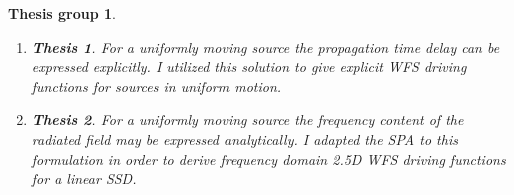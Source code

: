 \documentclass[10pt,twoside]{article}
\theoremstyle{thesisgroupstyle}
\newtheorem{thesisgroup}{Thesis group}
\newtheorem{thesis}{Thesis}[thesisgroup]
\begin{document}
\begin{thesisgroup}
\begin{enumerate}
\item[] \vspace{-7mm}\begin{thesis}For a uniformly moving source the propagation time delay can be expressed explicitly.
I utilized this solution to give explicit WFS driving functions for sources in uniform motion.\end{thesis}
\item[] \vspace{-7mm}\begin{thesis}For a uniformly moving source the frequency content of the radiated field may be expressed analytically.
I adapted the SPA to this formulation in order to derive frequency domain 2.5D WFS driving functions for a linear SSD.\end{thesis}
\end{enumerate}
\end{thesisgroup}
\end{document}
